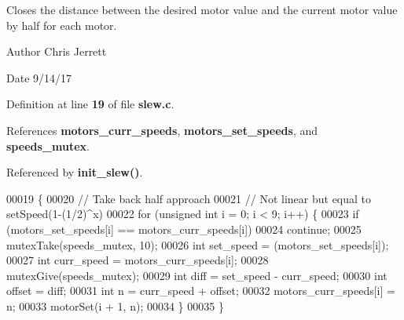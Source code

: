 Closes the distance between the desired motor value and the current motor value by half for each motor. 

\begin{DoxyAuthor}{Author}
Chris Jerrett 
\end{DoxyAuthor}
\begin{DoxyDate}{Date}
9/14/17 
\end{DoxyDate}


Definition at line \textbf{ 19} of file \textbf{ slew.\+c}.



References \textbf{ motors\+\_\+curr\+\_\+speeds}, \textbf{ motors\+\_\+set\+\_\+speeds}, and \textbf{ speeds\+\_\+mutex}.



Referenced by \textbf{ init\+\_\+slew()}.


\begin{DoxyCode}
00019                     \{
00020   \textcolor{comment}{// Take back half approach}
00021   \textcolor{comment}{// Not linear but equal to setSpeed(1-(1/2)^x)}
00022   \textcolor{keywordflow}{for} (\textcolor{keywordtype}{unsigned} \textcolor{keywordtype}{int} i = 0; i < 9; i++) \{
00023     \textcolor{keywordflow}{if} (motors_set_speeds[i] == motors_curr_speeds[i])
00024       \textcolor{keywordflow}{continue};
00025     mutexTake(speeds_mutex, 10);
00026     \textcolor{keywordtype}{int} set\_speed = (motors_set_speeds[i]);
00027     \textcolor{keywordtype}{int} curr\_speed = motors_curr_speeds[i];
00028     mutexGive(speeds_mutex);
00029     \textcolor{keywordtype}{int} diff = set\_speed - curr\_speed;
00030     \textcolor{keywordtype}{int} offset = diff;
00031     \textcolor{keywordtype}{int} n = curr\_speed + offset;
00032     motors_curr_speeds[i] = n;
00033     motorSet(i + 1, n);
00034   \}
00035 \}
\end{DoxyCode}
